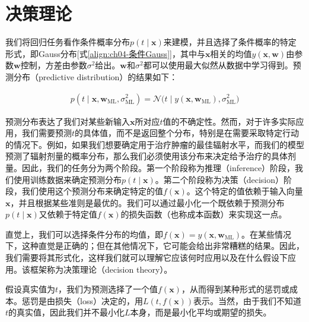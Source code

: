 \documentclass[../../main.tex]{subfiles}
\begin{document}
\section{决策理论}\label{section:ch04-决策理论}

我们将回归任务看作条件概率分布$p(t\mid\boldsymbol{x})$来建模，并且选择了条件概率的特定形式，即Gauss分布[式\eqref{align:ch04-条件Gauss}]，其中与$\boldsymbol{x}$相关的均值$y(\boldsymbol{x},\boldsymbol{w})$由参数$\boldsymbol{w}$控制，方差由参数$\sigma^2$给出。$\boldsymbol{w}$和$\sigma^2$都可以使用最大似然从数据中学习得到。预测分布（predictive distribution）的结果如下：

\begin{align}
  p(t\mid\boldsymbol{x},\boldsymbol{w}_{\mathrm{ML}},\sigma^2_{\mathrm{ML}})=\mathcal{N}\bigl(t\mid y(\boldsymbol{x},\boldsymbol{w}_{\mathrm{ML}}),\sigma^2_{\mathrm{ML}}\bigr)
  \label{align:ch04-预测分布}
\end{align}

预测分布表达了我们对某些新输入$\boldsymbol{x}$所对应$t$值的不确定性。然而，对于许多实际应用，我们需要预测$t$的具体值，而不是返回整个分布，特别是在需要采取特定行动的情况下。例如，如果我们想要确定用于治疗肿瘤的最佳辐射水平，而我们的模型预测了辐射剂量的概率分布，那么我们必须使用该分布来决定给予治疗的具体剂量。因此，我们的任务分为两个阶段。第一个阶段称为推理（inference）阶段，我们使用训练数据来确定预测分布$p(t\mid\boldsymbol{x})$。第二个阶段称为决策（decision）阶段，我们使用这个预测分布来确定特定的值$f(\boldsymbol{x})$。这个特定的值依赖于输入向量$\boldsymbol{x}$，并且根据某些准则是最优的。我们可以通过最小化一个既依赖于预测分布$p(t\mid\boldsymbol{x})$又依赖于特定值$f(\boldsymbol{x})$的损失函数（也称成本函数）来实现这一点。

直觉上，我们可以选择条件分布的均值，即$f(\boldsymbol{x})=y(\boldsymbol{x},\boldsymbol{w}_{\mathrm{ML}})$。在某些情况下，这种直觉是正确的；但在其他情况下，它可能会给出非常糟糕的结果。因此，我们需要将其形式化，这样我们就可以理解它应该何时应用以及在什么假设下应用。该框架称为决策理论（decision theory）。

假设真实值为$t$，我们为预测选择了一个值$f(\boldsymbol{x})$，从而得到某种形式的惩罚或成本。惩罚是由损失（loss）决定的，用$L(t,f(\boldsymbol{x}))$表示。当然，由于我们不知道$t$的真实值，因此我们并不最小化$L$本身，而是最小化平均或期望的损失。
\end{document}
